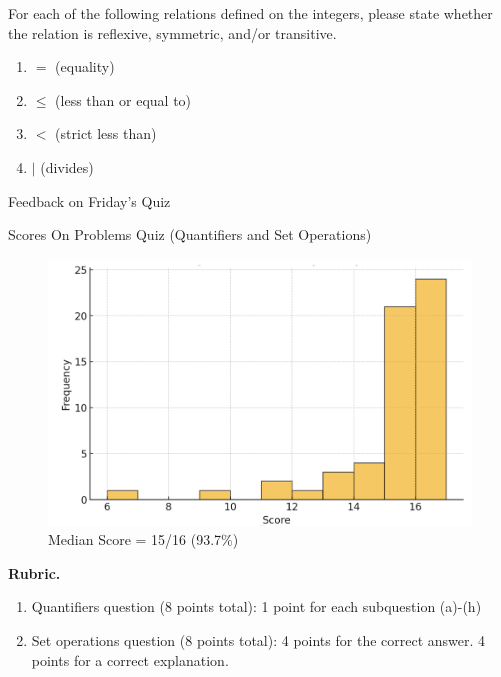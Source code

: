 \documentclass[10pt]{beamer}
\begin{document}
\begin{frame}
 \begin{myredbox}[title=Reading Quiz (Relations)]    
 For each of the following relations defined on the integers, please state whether the relation is reflexive, symmetric, and/or transitive.
 
 \begin{enumerate}
 	\item $=$ (equality)
 	\item $\leq$ (less than or equal to)
 	\item $<$ (strict less than)
 	\item $|$ (divides)
 \end{enumerate}

\end{myredbox}
	
\end{frame}


\begin{frame}[standout]
Feedback on Friday's Quiz	
\end{frame}

\begin{frame}{Scores On Problems Quiz (Quantifiers and Set Operations)}
\footnotesize 
\begin{figure}[ht]
        \centering
        \includegraphics[width=.75\textwidth]{images/problems_quiz_scores}
   		 \caption{Median Score = 15/16 (93.7\%)}
\end{figure}
\vfill 
\textbf{Rubric.} 

\begin{enumerate}
	\item Quantifiers question (8 points total): 1 point for each subquestion (a)-(h)
	\item Set operations question (8 points total): 4 points for the correct answer. 4 points for a correct explanation.
\end{enumerate}




\end{frame}
\end{document}
